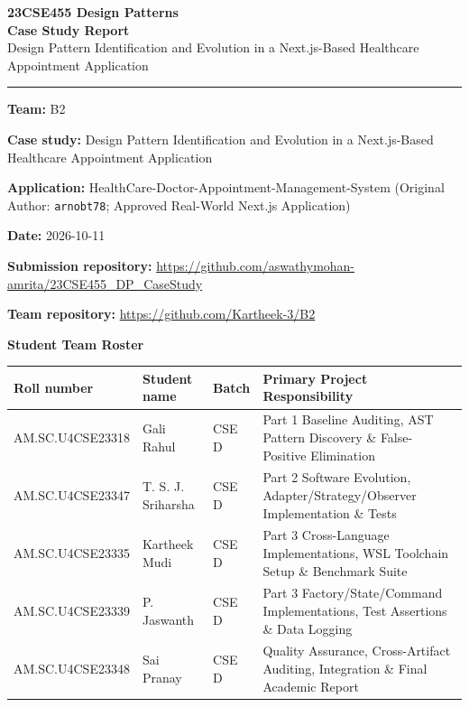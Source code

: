 \documentclass[11pt,a4paper]{article}
\newcommand{\entry}[2]{\textbf{#1:} #2\par}
\begin{document}
\begin{center}
{\Large\textbf{23CSE455 Design Patterns}}\\[4pt]
{\LARGE\textbf{Case Study Report}}\\[3pt]
{\large Design Pattern Identification and Evolution in a Next.js-Based Healthcare Appointment Application}
\end{center}

\vspace{2pt}
\hrule
\vspace{4pt}

\entry{Team}{B2}
\entry{Case study}{Design Pattern Identification and Evolution in a Next.js-Based Healthcare Appointment Application}
\entry{Application}{HealthCare-Doctor-Appointment-Management-System (Original Author: \texttt{arnobt78}; Approved Real-World Next.js Application)}
\entry{Date}{2026-10-11}
\entry{Submission repository}{\href{https://github.com/aswathymohan-amrita/23CSE455_DP_CaseStudy}{https://github.com/aswathymohan-amrita/23CSE455\_DP\_CaseStudy}}
\entry{Team repository}{\href{https://github.com/Kartheek-3/B2}{https://github.com/Kartheek-3/B2}}

\vspace{4pt}
\textbf{Student Team Roster}\par
\begin{tabularx}{\linewidth}{@{}lllX@{}}\toprule
Roll number & Student name & Batch & Primary Project Responsibility\\\midrule
AM.SC.U4CSE23318 & Gali Rahul & CSE D & Part 1 Baseline Auditing, AST Pattern Discovery \& False-Positive Elimination\\
AM.SC.U4CSE23347 & T. S. J. Sriharsha & CSE D & Part 2 Software Evolution, Adapter/Strategy/Observer Implementation \& Tests\\
AM.SC.U4CSE23335 & Kartheek Mudi & CSE D & Part 3 Cross-Language Implementations, WSL Toolchain Setup \& Benchmark Suite\\
AM.SC.U4CSE23339 & P. Jaswanth & CSE D & Part 3 Factory/State/Command Implementations, Test Assertions \& Data Logging\\
AM.SC.U4CSE23348 & Sai Pranay & CSE D & Quality Assurance, Cross-Artifact Auditing, Integration \& Final Academic Report\\\bottomrule
\end{tabularx}
\end{document}
